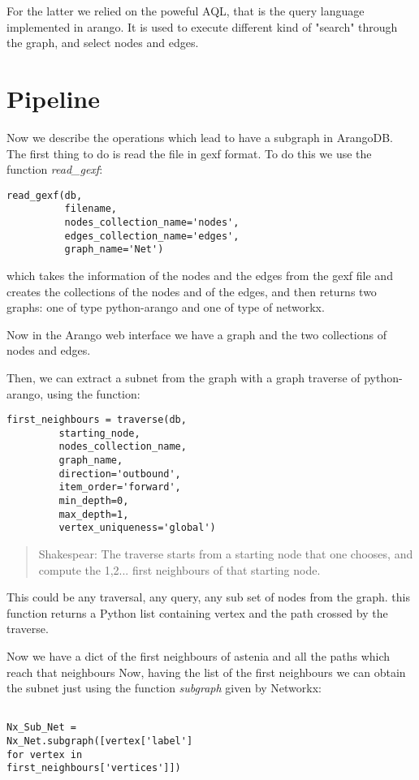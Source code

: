 \documentclass[11pt,twocolumn]{article}
\begin{document}
For the latter we relied on the poweful AQL, that is the query language implemented in arango. It is used to execute different kind of "search" through the graph, and select nodes and edges.


\section{Pipeline}

Now we describe the operations which lead to have a subgraph in ArangoDB.
The first thing to do is read the file in gexf format.
To do this we use the function \textit{read\_gexf}:
\begin{verbatim}
read_gexf(db,
          filename,
          nodes_collection_name='nodes',
          edges_collection_name='edges',
          graph_name='Net')
\end{verbatim}
which takes the information of the nodes and the edges from the gexf file and creates the collections of the nodes and of the edges, and then returns two graphs: one of type python-arango and one of type of networkx.

Now in the Arango web interface we have a graph and the two collections of nodes and edges.


Then, we can extract a subnet from the graph with a graph traverse of python-arango, using the function:
\begin{verbatim}
first_neighbours = traverse(db,
         starting_node,
         nodes_collection_name,
         graph_name,
         direction='outbound',
         item_order='forward',
         min_depth=0,
         max_depth=1,
         vertex_uniqueness='global')
\end{verbatim}

\begin{quote}{Shakespear:}
The traverse starts from a starting node that one chooses, and compute the 1,2... first neighbours of that starting node.
\end{quote}
This could be any traversal, any query, any sub set of nodes from the graph.
this function returns a Python list containing vertex and the path crossed by the traverse.

Now we have a dict of the first neighbours of astenia and all the paths which reach that neighbours
Now, having the list of the first neighbours we can obtain the subnet just using the function \textit{subgraph} given by Networkx:
\begin{verbatim}

Nx_Sub_Net =
Nx_Net.subgraph([vertex['label']
for vertex in
first_neighbours['vertices']])
\end{verbatim}
\end{document}

